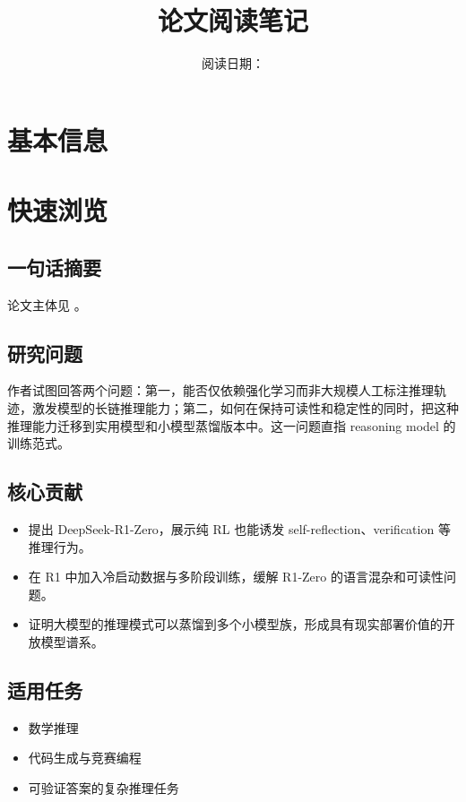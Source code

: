 \documentclass[UTF8,fontset=fandol,zihao=-4]{ctexart}
\title{\papertitle\\\large 论文阅读笔记}
\author{\paperauthors}
\date{阅读日期：\readingdate}
\begin{document}
\maketitle

\section{基本信息}

\RenderBasicInfoTable

\section{快速浏览}

\subsection{一句话摘要}
\paperonesentence 论文主体见 \cite{deepseekai2025r1}。

\subsection{研究问题}
作者试图回答两个问题：第一，能否仅依赖强化学习而非大规模人工标注推理轨迹，激发模型的长链推理能力；第二，如何在保持可读性和稳定性的同时，把这种推理能力迁移到实用模型和小模型蒸馏版本中。这一问题直指 reasoning model 的训练范式。

\subsection{核心贡献}
\begin{itemize}
  \item 提出 DeepSeek-R1-Zero，展示纯 RL 也能诱发 self-reflection、verification 等推理行为。
  \item 在 R1 中加入冷启动数据与多阶段训练，缓解 R1-Zero 的语言混杂和可读性问题。
  \item 证明大模型的推理模式可以蒸馏到多个小模型族，形成具有现实部署价值的开放模型谱系。
\end{itemize}

\subsection{适用任务}
\begin{itemize}
  \item 数学推理
  \item 代码生成与竞赛编程
  \item 可验证答案的复杂推理任务
\end{itemize}
\end{document}
